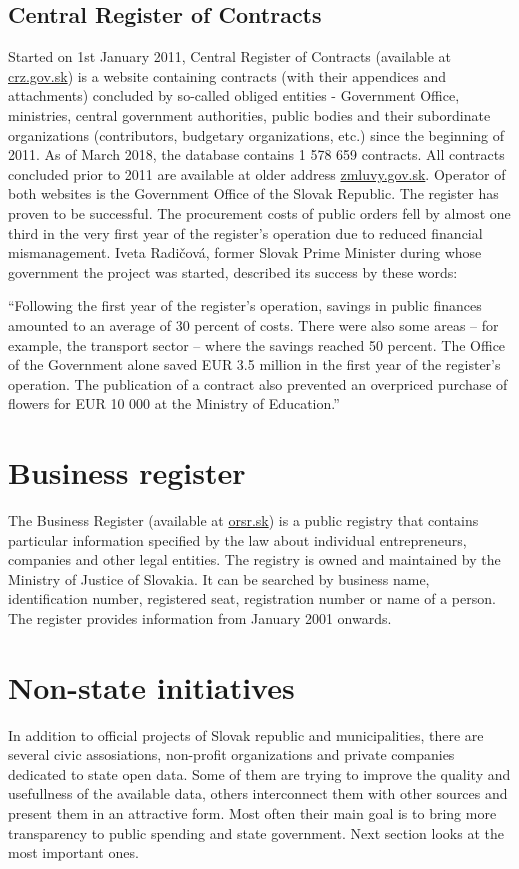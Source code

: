 \documentclass[thesis=B,english]{FITthesis}[2012/06/26]
\begin{document}
    \subsection{Central Register of Contracts}
    \label{crz}
    	Started on 1st January 2011, Central Register of Contracts (available at \href{https://www.crz.gov.sk}{crz.gov.sk}) is a website containing contracts (with their appendices and  attachments) concluded by so-called obliged entities - Government Office, ministries, central government authorities, public bodies and their subordinate organizations (contributors, budgetary organizations, etc.) since the beginning of 2011. As of March 2018, the database contains 1 578 659 contracts. All contracts concluded prior to 2011 are available at older address \href{http://www.zmluvy.gov.sk}{zmluvy.gov.sk}. Operator of both websites is the Government Office of the Slovak Republic. The register has proven to be successful. The procurement costs of public orders fell by almost one third in the very first year of the register’s operation due to reduced financial mismanagement. Iveta Radičová, former Slovak Prime Minister during whose government the project was started, described its success by these words:
\begin{displayquote}“Following the first year of the register’s operation, savings in public finances amounted to an average of 30 percent of costs. There were also some areas – for example, the transport sector – where the savings reached 50 percent. The Office of the Government alone saved EUR 3.5 million in the first year of the register’s operation. The publication of a contract also prevented an overpriced purchase of flowers for EUR 10 000 at the Ministry of Education.”\cite{joinupcrz}
\end{displayquote}
    \section{Business register}
    \label{businessregister}
     The Business Register (available at \href{http://www.orsr.sk}{orsr.sk}) is a public registry that contains particular information specified by the law about individual entrepreneurs, companies and other legal entities. The registry is owned and maintained by the Ministry of Justice of Slovakia. It can be searched by business name, identification number, registered seat, registration number or name of a person. The register provides information from January 2001 onwards.

	\section{Non-state initiatives}
	In addition to official projects of Slovak republic and municipalities, there are several civic assosiations, non-profit organizations and private companies dedicated to state open data. Some of them are trying to improve the quality and usefullness of the available data, others interconnect them with other sources and present them in an attractive form. Most often their main goal is to bring more transparency to public spending and state government. Next section looks at the most important ones.
\end{document}
